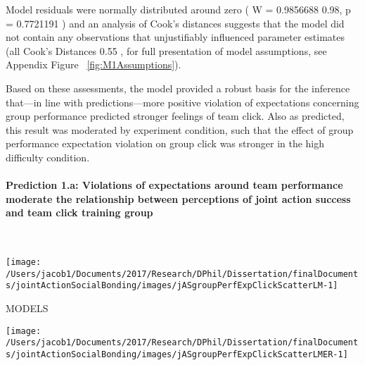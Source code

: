 \documentclass[english]{article}\usepackage[]{graphicx}\usepackage[]{color}
\makeatletter
\def\maxwidth{ %
  \ifdim\Gin@nat@width>\linewidth
    \linewidth
  \else
    \Gin@nat@width
  \fi
}
\newenvironment{kframe}{%
 \def\at@end@of@kframe{}%
 \ifinner\ifhmode%
  \def\at@end@of@kframe{\end{minipage}}%
  \begin{minipage}{\columnwidth}%
 \fi\fi%
 \def\FrameCommand##1{\hskip\@totalleftmargin \hskip-\fboxsep
 \colorbox{shadecolor}{##1}\hskip-\fboxsep
     \hskip-\linewidth \hskip-\@totalleftmargin \hskip\columnwidth}%
 \MakeFramed {\advance\hsize-\width
   \@totalleftmargin\z@ \linewidth\hsize
   \@setminipage}}%
 {\par\unskip\endMakeFramed%
 \at@end@of@kframe}
\newenvironment{knitrout}{}{} %
\newcommand{\myparagraph}[1]{\paragraph{#1}\mbox{}\\}
\newcommand{\pvalue}{p =}
\newcommand{\resdist}{W = }
\newcommand{\cooksD}{Cook's Distances}
\makeatother
\begin{document}
 Model residuals were normally distributed around zero
(
  \resdist
    0.9856688 0.98,
  \pvalue
    0.7721191
)
and an analysis of Cook's distances suggests that the model did not contain any observations that unjustifiably influenced parameter estimates
(all
  \cooksD
    0.55
  ,
  for full presentation of model assumptions, see Appendix Figure ~\ref{fig:M1Assumptions}).

Based on these assessments, the model provided a robust basis for the inference that---in line with predictions---more positive violation of expectations concerning group performance predicted stronger feelings of team click. Also as predicted, this result was moderated by experiment condition, such that the effect of group performance expectation violation on group click was stronger in the high difficulty condition.





\myparagraph{Prediction 1.a: Violations of expectations around team performance moderate the relationship between perceptions of joint action success and team click training group}

\begin{knitrout}
\color{fgcolor}\begin{kframe}


{\ttfamily\noindent\itshape\color{messagecolor}{\#\# Saving 3.5 x 3.5 in image}}

{\ttfamily\noindent\color{warningcolor}{\#\# Warning: Removed 1 rows containing missing values (geom\_point).}}

{\ttfamily\noindent\color{warningcolor}{\#\# Warning: Removed 1 rows containing missing values (geom\_point).}}\end{kframe}

{\centering \texttt{[image: /Users/jacob1/Documents/2017/Research/DPhil/Dissertation/finalDocuments/jointActionSocialBonding/images/jASgroupPerfExpClickScatterLM-1]} 

}



\end{knitrout}



MODELS








\begin{knitrout}
\color{fgcolor}\begin{kframe}


{\ttfamily\noindent\color{warningcolor}{\#\# Warning: Removed 1 rows containing missing values (geom\_point).}}\end{kframe}

{\centering \texttt{[image: /Users/jacob1/Documents/2017/Research/DPhil/Dissertation/finalDocuments/jointActionSocialBonding/images/jASgroupPerfExpClickScatterLMER-1]} 

}



\end{knitrout}
\end{document}
